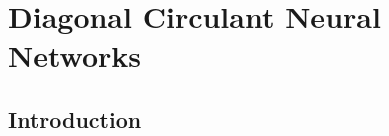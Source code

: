 \chapter{Diagonal Circulant Neural Networks}
\label{chapter:ch4-diagonal_circulant_neural_network}
\localtoc


\section{Introduction}
\label{chapter:p1-ch4_introduction}

